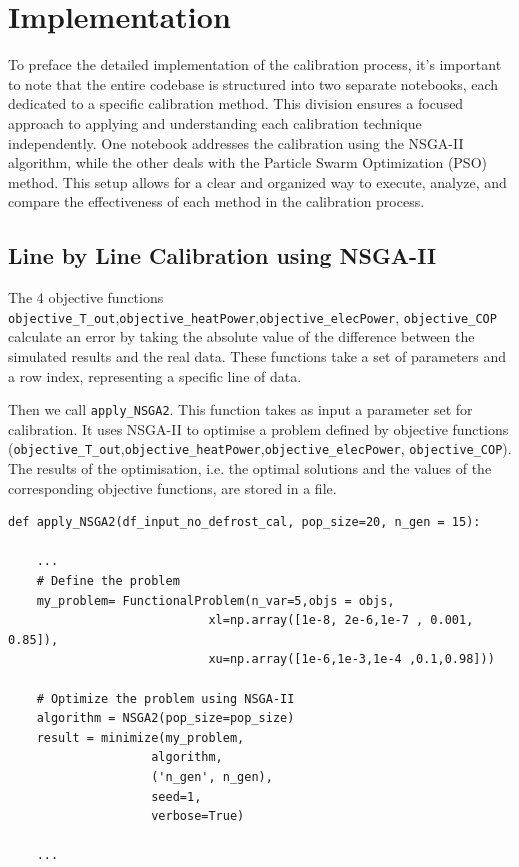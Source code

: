 \documentclass{report}
\begin{document}
\section{Implementation}

To preface the detailed implementation of the calibration process, it's important to note that the entire codebase is structured into two separate notebooks, each dedicated to a specific calibration method. This division ensures a focused approach to applying and understanding each calibration technique independently. One notebook addresses the calibration using the NSGA-II algorithm, while the other deals with the Particle Swarm Optimization (PSO) method. This setup allows for a clear and organized way to execute, analyze, and compare the effectiveness of each method in the calibration process.

\subsection{Line by Line Calibration using NSGA-II}

The 4 objective functions
\texttt{objective\_\texttt{T\_out}},\texttt{objective\_heatPower},\texttt{objective\_elecPower},
\texttt{objective\_COP} calculate an error by taking the absolute value of the difference between 
the simulated results and the real data. These functions take a set of parameters and a row 
index, representing a specific line of data.


Then we call \texttt{apply\_NSGA2}. This function takes as input a parameter set for calibration. 
It uses NSGA-II to optimise a problem defined by objective functions 
(\texttt{objective\_\texttt{T\_out}},\texttt{objective\_heatPower},\texttt{objective\_elecPower},
\texttt{objective\_COP}). The results of the 
optimisation, i.e. the optimal solutions and the values of the corresponding objective functions, 
are stored  in a file.
\begin{lstlisting}
def apply_NSGA2(df_input_no_defrost_cal, pop_size=20, n_gen = 15):

    ...
    # Define the problem
    my_problem= FunctionalProblem(n_var=5,objs = objs,
                            xl=np.array([1e-8, 2e-6,1e-7 , 0.001, 0.85]),
                            xu=np.array([1e-6,1e-3,1e-4 ,0.1,0.98]))
    
    # Optimize the problem using NSGA-II
    algorithm = NSGA2(pop_size=pop_size)
    result = minimize(my_problem,
                    algorithm,
                    ('n_gen', n_gen),
                    seed=1,
                    verbose=True)

    ...
\end{lstlisting}
\end{document}
